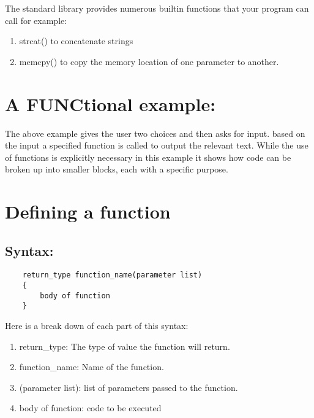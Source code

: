 \documentclass[12pt, letterpaper]{report}
\begin{document}
The standard library provides numerous builtin functions that your program can call
for example:
\begin{enumerate}
	\item strcat() to concatenate strings
	\item memcpy() to copy the memory location of one parameter to another.
\end{enumerate}

\section*{A FUNCtional example:}
	

The above example gives the user two choices and then asks for input. based on
the input a specified function is called to output the relevant text. While the 
use of functions is explicitly necessary in this example it shows how code can be
broken up into smaller blocks, each with a specific purpose.

\clearpage
\section{Defining a function}

\subsection*{Syntax:}
\begin{lstlisting}
	return_type function_name(parameter list)
	{
		body of function
	}
\end{lstlisting}

Here is a break down of each part of this syntax:

\begin{enumerate}
	\item return\_type: The type of value the function will return.
	\item function\_name: Name of the function.
	\item (parameter list): list of parameters passed to the function.
	\item body of function: code to be executed
\end{enumerate}
\end{document}
